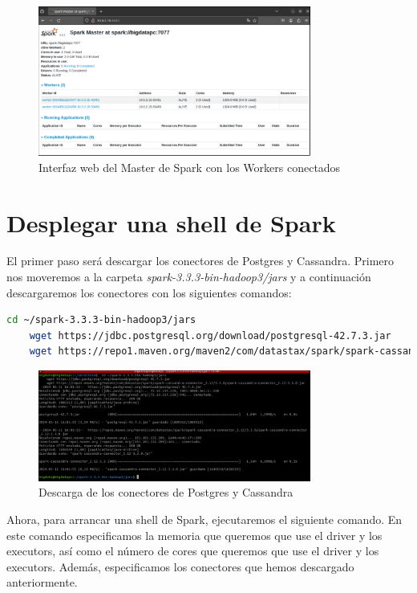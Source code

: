 \begin{figure}[H]
    \centering
    \includegraphics[width=0.8\textwidth]{figures/21.png}
    \caption{Interfaz web del Master de Spark con los Workers conectados}
\end{figure}

\section{Desplegar una shell de Spark}

El primer paso será descargar los conectores de Postgres y Cassandra. Primero nos moveremos a la carpeta \textit{spark-3.3.3-bin-hadoop3/jars} y a continuación descargaremos los conectores con los siguientes comandos:

\begin{lstlisting}[language=bash]
    cd ~/spark-3.3.3-bin-hadoop3/jars
    wget https://jdbc.postgresql.org/download/postgresql-42.7.3.jar
    wget https://repo1.maven.org/maven2/com/datastax/spark/spark-cassandra-connector_2.12/3.3.0/spark-cassandra-connector_2.12-3.3.0.jar
\end{lstlisting}

\begin{figure}[H]
    \centering
    \includegraphics[width=0.8\textwidth]{figures/22.png}
    \caption{Descarga de los conectores de Postgres y Cassandra}
\end{figure}

Ahora, para arrancar una shell de Spark, ejecutaremos el siguiente comando. En este comando especificamos la memoria que queremos que use el driver y los executors, así como el número de cores que queremos que use el driver y los executors. Además, especificamos los conectores que hemos descargado anteriormente.

